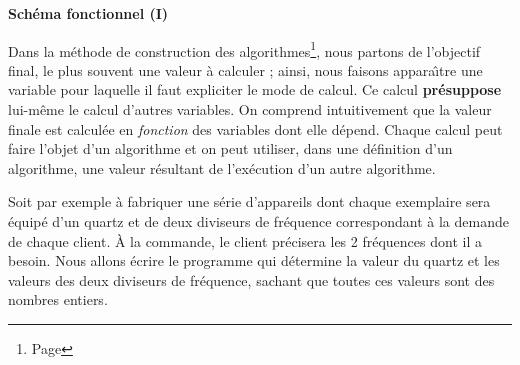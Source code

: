 \label{Composition}
\setcounter{section}{0}
\addtocounter{section}{1}
\centerline{\Large\bf Sch\'ema fonctionnel (I)}

 
 \noindent\hrulefill  


Dans la m\'ethode de construction des algorithmes\footnote{
Page \pageref{Methode}}, nous
partons de l'objectif final, le plus souvent une valeur \`a calculer ; ainsi,
nous faisons appara\^\i tre une variable pour laquelle il faut expliciter
le mode de calcul. Ce calcul {\bf pr\'esuppose} lui-m\^eme le calcul d'autres
variables. On comprend intuitivement que la valeur finale est calcul\'ee 
en {\em fonction} des variables dont elle d\'epend. 
Chaque calcul peut faire l'objet d'un algorithme et 
   on peut utiliser, dans une d\'efinition d'un algorithme, une valeur
r\'esultant de l'ex\'ecution d'un autre algorithme. 

Soit par exemple 
\`a fabriquer une s\'erie d'appareils dont chaque exemplaire sera \'equip\'e
d'un quartz et de deux diviseurs de fr\'equence correspondant \`a la demande de
chaque client. \`A la commande, le client pr\'ecisera les 2 fr\'equences dont il a
besoin. Nous allons \'ecrire le programme qui d\'etermine la valeur du quartz et
les valeurs des deux diviseurs de fr\'equence, sachant que toutes ces
valeurs  sont
 des nombres entiers.

